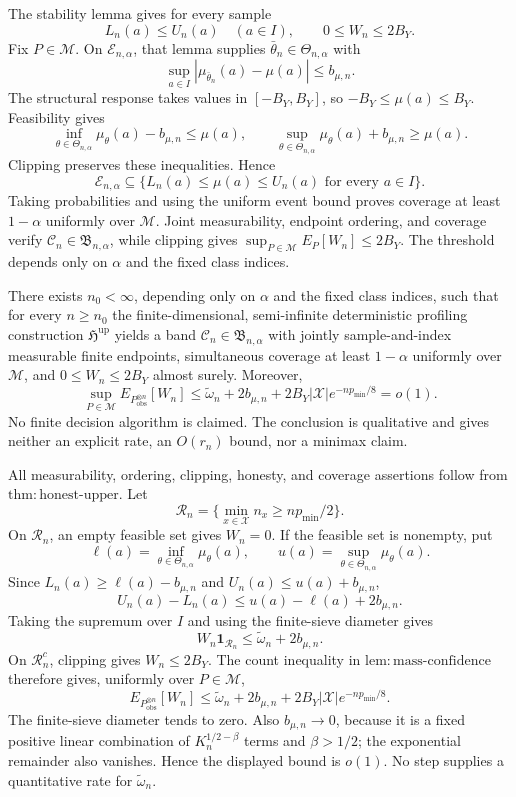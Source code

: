 The stability lemma gives for every sample
\[
 L_n(a)\le U_n(a)\quad(a\in I),
 \qquad0\le W_n\le2B_Y.
\]
Fix \(P\in\mathcal M\). On \(\mathcal E_{n,\alpha}\), that lemma supplies \(\bar\theta_n\in\Theta_{n,\alpha}\) with
\[
 \sup_{a\in I}|\mu_{\bar\theta_n}(a)-\mu(a)|\le b_{\mu,n}.
\]
The structural response takes values in \([-B_Y,B_Y]\), so \(-B_Y\le\mu(a)\le B_Y\). Feasibility gives
\[
 \inf_{\theta\in\Theta_{n,\alpha}}\mu_\theta(a)-b_{\mu,n}\le\mu(a),
 \qquad
 \sup_{\theta\in\Theta_{n,\alpha}}\mu_\theta(a)+b_{\mu,n}\ge\mu(a).
\]
Clipping preserves these inequalities. Hence
\[
 \mathcal E_{n,\alpha}\subseteq
 \{L_n(a)\le\mu(a)\le U_n(a)\text{ for every }a\in I\}.
\]
Taking probabilities and using the uniform event bound proves coverage at least \(1-\alpha\) uniformly over \(\mathcal M\). Joint measurability, endpoint ordering, and coverage verify \(\mathcal C_n\in\mathfrak B_{n,\alpha}\), while clipping gives \(\sup_{P\in\mathcal M}E_P[W_n]\le2B_Y\). The threshold depends only on \(\alpha\) and the fixed class indices.

There exists \(n_0<\infty\), depending only on \(\alpha\) and the fixed class indices, such that for every \(n\ge n_0\) the finite-dimensional, semi-infinite deterministic profiling construction \(\mathfrak H^{\mathrm{up}}\) yields a band \(\mathcal C_n\in\mathfrak B_{n,\alpha}\) with jointly sample-and-index measurable finite endpoints, simultaneous coverage at least \(1-\alpha\) uniformly over \(\mathcal M\), and \(0\le W_n\le2B_Y\) almost surely. Moreover,
\[
 \sup_{P\in\mathcal M}E_{P_{\mathrm{obs}}^{\otimes n}}[W_n]
 \le \widetilde\omega_n+2b_{\mu,n}
   +2B_Y|\mathcal X|e^{-np_{\min}/8}=o(1).
\]
No finite decision algorithm is claimed. The conclusion is qualitative and gives neither an explicit rate, an \(O(r_n)\) bound, nor a minimax claim.

All measurability, ordering, clipping, honesty, and coverage assertions follow from \(\mathrm{thm{:}honest\text{-}upper}\). Let
\[
 \mathcal R_n=\{\min_{x\in\mathcal X}n_x\ge np_{\min}/2\}.
\]
On \(\mathcal R_n\), an empty feasible set gives \(W_n=0\). If the feasible set is nonempty, put
\[
 \ell(a)=\inf_{\theta\in\Theta_{n,\alpha}}\mu_\theta(a),
 \qquad
 u(a)=\sup_{\theta\in\Theta_{n,\alpha}}\mu_\theta(a).
\]
Since \(L_n(a)\ge\ell(a)-b_{\mu,n}\) and \(U_n(a)\le u(a)+b_{\mu,n}\),
\[
 U_n(a)-L_n(a)\le u(a)-\ell(a)+2b_{\mu,n}.
\]
Taking the supremum over \(I\) and using the finite-sieve diameter gives
\[
 W_n\mathbf1_{\mathcal R_n}\le\widetilde\omega_n+2b_{\mu,n}.
\]
On \(\mathcal R_n^c\), clipping gives \(W_n\le2B_Y\). The count inequality in \(\mathrm{lem{:}mass\text{-}confidence}\) therefore gives, uniformly over \(P\in\mathcal M\),
\[
 E_{P_{\mathrm{obs}}^{\otimes n}}[W_n]
 \le\widetilde\omega_n+2b_{\mu,n}
   +2B_Y|\mathcal X|e^{-np_{\min}/8}.
\]
The finite-sieve diameter tends to zero. Also \(b_{\mu,n}\to0\), because it is a fixed positive linear combination of \(K_n^{1/2-\beta}\) terms and \(\beta>1/2\); the exponential remainder also vanishes. Hence the displayed bound is \(o(1)\). No step supplies a quantitative rate for \(\widetilde\omega_n\).

